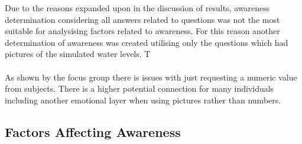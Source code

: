 Due to the reasons expanded upon in the discussion of results, awareness determination considering all answers related to questions was not the most suitable for analysising factors related to awareness. For this reason another determination of awareness was created utilising only the questions which had pictures of the simulated water levels. T

\paragraph{}
As shown by the focus group there is issues with just requesting a numeric value from subjects. There is a higher potential connection for many individuals including another emotional layer when using pictures rather than numbers. 

\subsection{Factors Affecting Awareness}